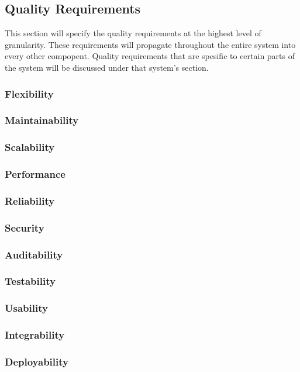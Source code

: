 \subsection{Quality Requirements}
This section will specify the quality requirements at the highest level of
granularity. These requirements will propagate throughout the entire system
into every other compopent. Quality requirements that are spesific to certain
parts of the system will be discussed under that system's section.

\subsubsection{Flexibility}
\subsubsection{Maintainability}
\subsubsection{Scalability}
\subsubsection{Performance}
\subsubsection{Reliability}
\subsubsection{Security}
\subsubsection{Auditability}
\subsubsection{Testability}
\subsubsection{Usability}
\subsubsection{Integrability}
\subsubsection{Deployability}

